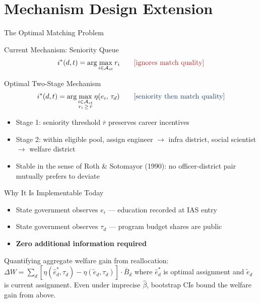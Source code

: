 \documentclass[aspectratio=169,10pt]{beamer}
\begin{document}
\section{Mechanism Design Extension}

\begin{frame}{The Optimal Matching Problem}

\begin{block}{Current Mechanism: Seniority Queue}
\[
i^*(d,t) = \arg\max_{i \in \mathcal{A}_{st}} r_i
\qquad \textcolor{iasred}{\text{[ignores match quality]}}
\]
\end{block}

\bigskip

\begin{block}{Optimal Two-Stage Mechanism}
\[
i^*(d,t) = \arg\max_{\substack{i \in \mathcal{A}_{st} \\ r_i \,\geq\, \bar{r}}}
\eta(e_i,\, \tau_d)
\qquad \textcolor{iasblue}{\text{[seniority then match quality]}}
\]
\end{block}

\begin{itemize}\setlength\itemsep{4pt}
  \item Stage 1: seniority threshold $\bar{r}$ preserves career incentives
  \item Stage 2: within eligible pool, assign engineer $\to$ infra district,
        social scientist $\to$ welfare district
  \item Stable in the sense of Roth \& Sotomayor (1990):
        no officer-district pair mutually prefers to deviate
\end{itemize}

\bigskip

\begin{block}{Why It Is Implementable Today}
\begin{itemize}\setlength\itemsep{3pt}
  \item State government observes $e_i$ --- education recorded at IAS entry
  \item State government observes $\tau_d$ --- program budget shares are public
  \item \textbf{Zero additional information required}
\end{itemize}
\end{block}

\vspace{4pt}
{\footnotesize \color{iasgray}
Quantifying aggregate welfare gain from reallocation:
$\Delta W = \sum_d \left[\eta(\hat e^*_d, \tau_d) - \eta(\tilde e_d, \tau_d)\right] \cdot \bar B_d$
where $\hat e^*_d$ is optimal assignment and $\tilde e_d$ is current assignment.
Even under imprecise $\hat\beta$, bootstrap CIs bound the welfare gain from above.}

\end{frame}
\end{document}
